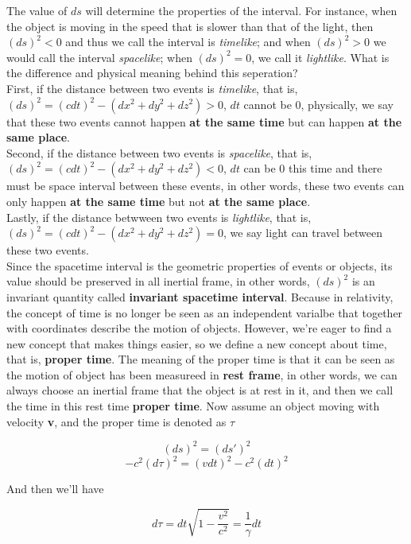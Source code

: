 \documentclass[12pt]{article}
\begin{document}
The value of $ds$ will determine the properties of the interval. For instance, when the object is moving in the speed that is slower than that of the light, then $(ds)^2 < 0$ and thus we call the interval is \textit{timelike}; and when $(ds)^2 > 0$ we would call the interval \textit{spacelike}; when $(ds)^2 = 0$, we call it \textit{lightlike}. What is the difference and physical meaning behind this seperation?
\\
\indent 
First, if the distance between two events is \textit{timelike}, that is, $(ds)^2 = (cdt)^2 - (dx^2 + dy^2 + dz^2) > 0$, $dt$ cannot be $0$, physically, we say that these two events cannot happen \textbf{at the same time} but can happen \textbf{at the same place}.
\\
\indent 
Second, if the distance between two events is \textit{spacelike}, that is, $(ds)^2 = (cdt)^2 - (dx^2 + dy^2 + dz^2) < 0$, $dt$ can be $0$ this time and there must be space interval between these events, in other words, these two events can only happen \textbf{at the same time} but not \textbf{at the same place}.
\\
\indent
Lastly, if the distance betwween two events is \textit{lightlike}, that is, $(ds)^2 = (cdt)^2 - (dx^2 + dy^2 + dz^2) = 0$, we say light can travel between these two events.
\\
\indent
Since the spacetime interval is the geometric properties of events or objects, its value should be preserved in all inertial frame, in other words, $(ds)^2$ is an invariant quantity called \textbf{invariant spacetime interval}. Because in relativity, the concept of time is no longer be seen as an independent varialbe that together with coordinates describe the motion of objects. However, we're eager to find a new concept that makes things easier, so we define a new concept about time, that is, \textbf{proper time}. The meaning of the proper time is that it can be seen as the motion of object has been measureed in \textbf{rest frame}, in other words, we can always choose an inertial frame that the object is at rest in it, and then we call the time in this rest time \textbf{proper time}.
Now assume an object moving with velocity \textbf{v}, and the proper time is denoted as $\tau$
\begin{center}
    \[ (ds)^2 = (ds')^2 \]
    \[ -c^2(d\tau)^2 = (vdt)^2 - c^2(dt)^2 \]
\end{center}

And then we'll have 

\begin{center}
    \[d\tau = dt \sqrt{1 - \frac{v^2}{c^2}} = \frac{1}{\gamma} dt \]
\end{center}
\end{document}
